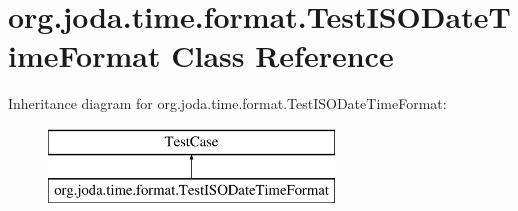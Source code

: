 \hypertarget{classorg_1_1joda_1_1time_1_1format_1_1_test_i_s_o_date_time_format}{\section{org.\-joda.\-time.\-format.\-Test\-I\-S\-O\-Date\-Time\-Format Class Reference}
\label{classorg_1_1joda_1_1time_1_1format_1_1_test_i_s_o_date_time_format}
}
Inheritance diagram for org.\-joda.\-time.\-format.\-Test\-I\-S\-O\-Date\-Time\-Format\-:\begin{figure}[H]
\begin{center}
\leavevmode
\includegraphics[height=2.000000cm]{classorg_1_1joda_1_1time_1_1format_1_1_test_i_s_o_date_time_format}
\end{center}
\end{figure}
